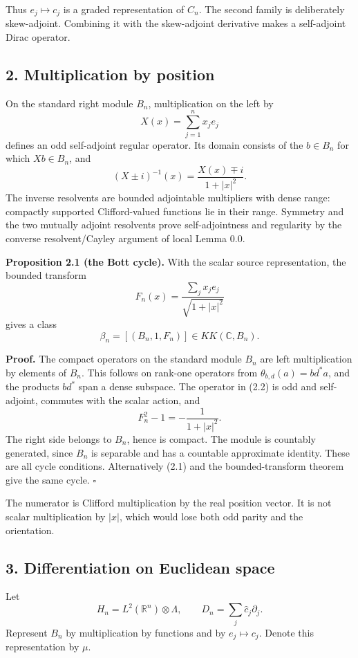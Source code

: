 \documentclass[
  11pt,
]{article}
\begin{document}
Thus \(e_j\mapsto c_j\) is a graded representation of \(C_n\). The
second family is deliberately skew-adjoint. Combining it with the
skew-adjoint derivative makes a self-adjoint Dirac operator.

\subsection{2. Multiplication by
position}\label{multiplication-by-position}

On the standard right module \(B_n\), multiplication on the left by \[
X(x)=\sum_{j=1}^n x_je_j
\] defines an odd self-adjoint regular operator. Its domain consists of
the \(b\in B_n\) for which \(Xb\in B_n\), and \[
(X\pm i)^{-1}(x)=\frac{X(x)\mp i}{1+|x|^2}.
\tag{2.1}
\] The inverse resolvents are bounded adjointable multipliers with dense
range: compactly supported Clifford-valued functions lie in their range.
Symmetry and the two mutually adjoint resolvents prove self-adjointness
and regularity by the converse resolvent/Cayley argument of local Lemma
0.0.

\textbf{Proposition 2.1 (the Bott cycle).} With the scalar source
representation, the bounded transform \[
F_n(x)=\frac{\sum_jx_je_j}{\sqrt{1+|x|^2}}
\tag{2.2}
\] gives a class \[
\beta_n=[(B_n,1,F_n)]\in KK(\mathbb C,B_n).
\]

\textbf{Proof.} The compact operators on the standard module \(B_n\) are
left multiplication by elements of \(B_n\). This follows on rank-one
operators from \(\theta_{b,d}(a)=bd^*a\), and the products \(bd^*\) span
a dense subspace. The operator in (2.2) is odd and self-adjoint,
commutes with the scalar action, and \[
F_n^2-1=-\frac1{1+|x|^2}.
\tag{2.3}
\] The right side belongs to \(B_n\), hence is compact. The module is
countably generated, since \(B_n\) is separable and has a countable
approximate identity. These are all cycle conditions. Alternatively
(2.1) and the bounded-transform theorem give the same cycle. \(\square\)

The numerator is Clifford multiplication by the real position vector. It
is not scalar multiplication by \(|x|\), which would lose both odd
parity and the orientation.

\subsection{3. Differentiation on Euclidean
space}\label{differentiation-on-euclidean-space}

Let \[
H_n=L^2(\mathbb R^n)\otimes\Lambda,\qquad
D_n=\sum_j\widehat c_j\partial_j.
\tag{3.1}
\] Represent \(B_n\) by multiplication by functions and by
\(e_j\mapsto c_j\). Denote this representation by \(\mu\).
\end{document}
